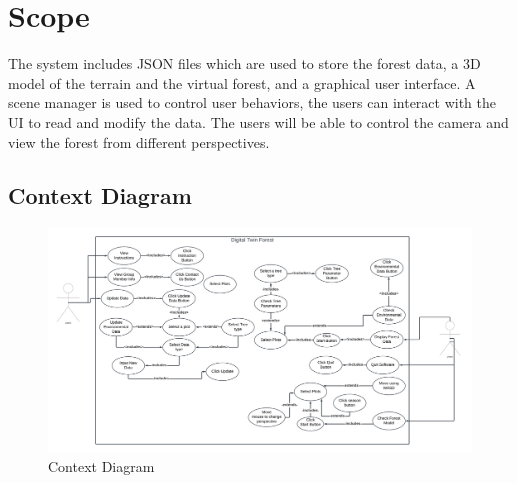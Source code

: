 \documentclass[12pt, titlepage]{article}
\begin{document}
\section{Scope}

The system includes JSON files which are used to 
store the forest data, a 3D model of the terrain and 
the virtual forest, and a graphical user interface. 
A scene manager is used to control user behaviors, 
the users can interact with the UI to read and modify
the data. The users will be able to control the 
camera and view the forest from different 
perspectives.

\subsection{Context Diagram}
\begin{figure}[H]
    \centering
    \includegraphics[scale=0.28]{SysDesPic/Use_Case.png}
    \caption{Context Diagram}
    \label{usecase}
\end{figure}
\end{document}
